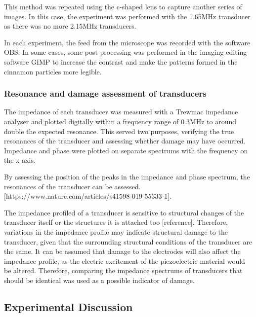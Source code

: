 \documentclass[11pt,a4paper]{article}
\begin{document}
This method was repeated using the c-shaped lens to capture another series of images. In this case, the experiment was performed with the 1.65MHz transducer as there was no more 2.15MHz transducers.

In each experiment, the feed from the microscope was recorded with the software OBS. In some cases, some post processing was performed in the imaging editing software GIMP to increase the contrast and make the patterns formed in the cinnamon particles more legible.

\subsubsection{Resonance and damage assessment of transducers}

The impedance of each transducer was measured with a Trewmac impedance analyser and plotted digitally within a frequency range of 0.3MHz to around double the expected resonance. This served two purposes, verifying the true resonances of the transducer and assessing whether damage may have occurred. Impedance and phase were plotted on separate spectrums with the frequency on the x-axis.

By assessing the position of the peaks in the impedance and phase spectrum, the resonances of the transducer can be assessed.[https://www.nature.com/articles/s41598-019-55333-1].

The impedance profiled of a transducer is sensitive to structural changes of the transducer itself or the structures it is attached too [reference]. Therefore, variations in the impedance profile may indicate structural damage to the transducer, given that the surrounding structural conditions of the transducer are the same. It can be assumed that damage to the electrodes will also affect the impedance profile, as the electric excitement of the piezoelectric material would be altered. Therefore, comparing the impedance spectrums of transducers that should be identical was used as a possible indicator of damage.

\subsection{Experimental Discussion}
\end{document}
